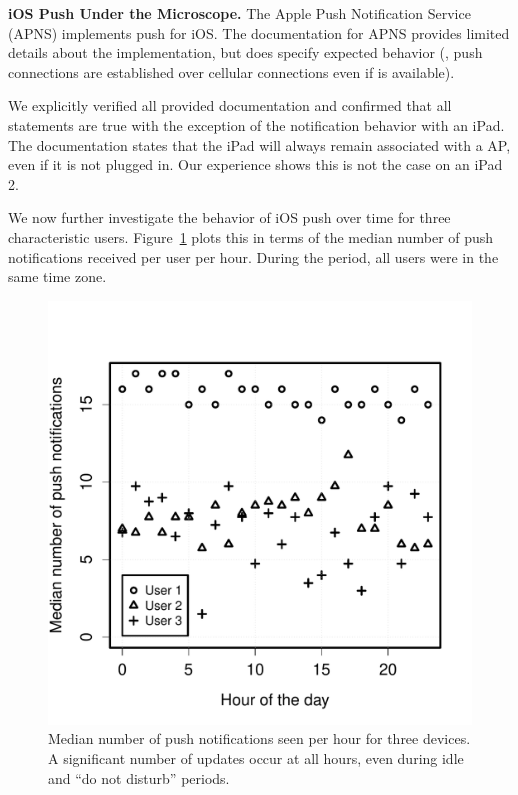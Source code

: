 \noindent \textbf{iOS Push Under the Microscope.} 
The Apple Push Notification Service 
(APNS) implements push for iOS. The documentation for APNS provides limited details about 
the implementation, but does specify expected behavior (\eg, push 
connections are established over cellular connections even if 
\wifi is available). 

We explicitly verified all provided documentation and confirmed that 
all statements are true with the exception of the notification behavior 
with an iPad. The documentation states that the iPad will always 
remain associated with a \wifi AP, even if it is not plugged in. Our 
experience shows this is not the case on an iPad 2.

We now further investigate 
the behavior of iOS push over time for three characteristic users. Figure~\ref{fig:pushHourly} 
plots this in terms of the median number of push notifications received per 
user per hour. During the period, all users were in the same time zone.

\begin{figure}
\vspace{-2.5em}
\centering
        \includegraphics[width=\linewidth]{./plots/iosPushHourDistrib.pdf}
  \caption{Median number of push notifications seen per hour for three devices. 
  A significant number of updates occur at all hours, even during idle and ``do not disturb'' periods.}
  \label{fig:pushHourly}
  \vspace{\postfigspace}
\end{figure}

